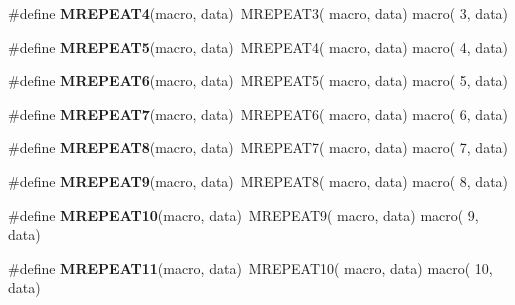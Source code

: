 \begin{DoxyCompactItemize}
\item 
\hypertarget{group__group__sam0__utils__mrepeat_ga565fa75af0244153e43c1666192ef212}{}\#define {\bfseries M\+R\+E\+P\+E\+A\+T4}(macro,  data)~M\+R\+E\+P\+E\+A\+T3(  macro, data)   macro(  3, data)\label{group__group__sam0__utils__mrepeat_ga565fa75af0244153e43c1666192ef212}

\item 
\hypertarget{group__group__sam0__utils__mrepeat_ga0961aba6bdaaed655d3f5c3855b06928}{}\#define {\bfseries M\+R\+E\+P\+E\+A\+T5}(macro,  data)~M\+R\+E\+P\+E\+A\+T4(  macro, data)   macro(  4, data)\label{group__group__sam0__utils__mrepeat_ga0961aba6bdaaed655d3f5c3855b06928}

\item 
\hypertarget{group__group__sam0__utils__mrepeat_ga102c9b97712b4ad279ea3693ec4421e5}{}\#define {\bfseries M\+R\+E\+P\+E\+A\+T6}(macro,  data)~M\+R\+E\+P\+E\+A\+T5(  macro, data)   macro(  5, data)\label{group__group__sam0__utils__mrepeat_ga102c9b97712b4ad279ea3693ec4421e5}

\item 
\hypertarget{group__group__sam0__utils__mrepeat_gacacd88e2ffdff7800bff4752a7d1b3af}{}\#define {\bfseries M\+R\+E\+P\+E\+A\+T7}(macro,  data)~M\+R\+E\+P\+E\+A\+T6(  macro, data)   macro(  6, data)\label{group__group__sam0__utils__mrepeat_gacacd88e2ffdff7800bff4752a7d1b3af}

\item 
\hypertarget{group__group__sam0__utils__mrepeat_ga6681360ad4a3c108eb14310b7516b567}{}\#define {\bfseries M\+R\+E\+P\+E\+A\+T8}(macro,  data)~M\+R\+E\+P\+E\+A\+T7(  macro, data)   macro(  7, data)\label{group__group__sam0__utils__mrepeat_ga6681360ad4a3c108eb14310b7516b567}

\item 
\hypertarget{group__group__sam0__utils__mrepeat_ga0b1d53ca9c8a88c0f50baca731190b2b}{}\#define {\bfseries M\+R\+E\+P\+E\+A\+T9}(macro,  data)~M\+R\+E\+P\+E\+A\+T8(  macro, data)   macro(  8, data)\label{group__group__sam0__utils__mrepeat_ga0b1d53ca9c8a88c0f50baca731190b2b}

\item 
\hypertarget{group__group__sam0__utils__mrepeat_gade8cd92280a999cf105148e3fa4c5da9}{}\#define {\bfseries M\+R\+E\+P\+E\+A\+T10}(macro,  data)~M\+R\+E\+P\+E\+A\+T9(  macro, data)   macro(  9, data)\label{group__group__sam0__utils__mrepeat_gade8cd92280a999cf105148e3fa4c5da9}

\item 
\hypertarget{group__group__sam0__utils__mrepeat_gabd366a56c6734a5ce3ff89dc84760244}{}\#define {\bfseries M\+R\+E\+P\+E\+A\+T11}(macro,  data)~M\+R\+E\+P\+E\+A\+T10( macro, data)   macro( 10, data)\label{group__group__sam0__utils__mrepeat_gabd366a56c6734a5ce3ff89dc84760244}


\end{DoxyCompactItemize}
